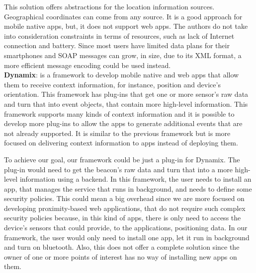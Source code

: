 This solution offers abstractions for the location
information sources. Geographical coordinates can
come from any source. It is a good approach for
mobile native apps, but, it does not support web apps.
The authors do not take into consideration
constraints in terms of resources, such as
lack of Internet connection and battery.
Since most users have limited data plans for
their smartphones and SOAP messages can
grow, in size, due to its XML format,
a more efficient message encoding could be used
instead.
\\
\textbf{Dynamix}\cite{Carlson2012}:
is a framework to develop
mobile native and web apps that allow them to receive
context information, for instance, position and device's
orientation. This framework has plug-ins that get
one or more sensor's raw data and turn that into event
objects, that contain more high-level information.
This framework supports many kinds of context information
and it is possible to develop more plug-ins to allow the
apps to generate additional events that are not
already supported. It is similar to the previous
framework but is more focused on delivering context
information to apps instead of deploying them.

To achieve our goal, our framework could be just a
plug-in for Dynamix. The plug-in would
need to get the beacon's raw data and
turn that into a more high-level information
using a backend. In this framework,
the user needs to install an app, that manages the service
that runs in background, and needs to define some
security policies. This could mean a big overhead since
we are more focused on developing proximity-based
web applications, that do not require such complex security
policies because, in this kind of apps, there is only need
to access the device's sensors that could provide,
to the applications, positioning data.
In our framework, the user would only need to
install one app, let it run in background and turn on
bluetooth. Also, this does not offer a complete solution
since the owner of one or more points of interest
has no way of installing new apps on them.

